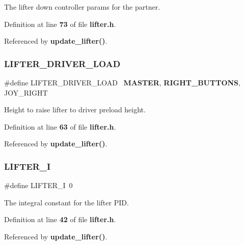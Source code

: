 The lifter down controller params for the partner. 



Definition at line \textbf{ 73} of file \textbf{ lifter.\+h}.



Referenced by \textbf{ update\+\_\+lifter()}.

\mbox{\label{lifter_8h_ad4a88f04887d4f1f4e5fa057b29f68e9}} 
\subsubsection{L\+I\+F\+T\+E\+R\+\_\+\+D\+R\+I\+V\+E\+R\+\_\+\+L\+O\+AD}
{\footnotesize\ttfamily \#define L\+I\+F\+T\+E\+R\+\_\+\+D\+R\+I\+V\+E\+R\+\_\+\+L\+O\+AD~\textbf{ M\+A\+S\+T\+ER}, \textbf{ R\+I\+G\+H\+T\+\_\+\+B\+U\+T\+T\+O\+NS}, J\+O\+Y\+\_\+\+R\+I\+G\+HT}



Height to raise lifter to driver preload height. 



Definition at line \textbf{ 63} of file \textbf{ lifter.\+h}.



Referenced by \textbf{ update\+\_\+lifter()}.

\mbox{\label{lifter_8h_a4950feabec4e85bf27c1f2e4ec98755a}} 
\subsubsection{L\+I\+F\+T\+E\+R\+\_\+I}
{\footnotesize\ttfamily \#define L\+I\+F\+T\+E\+R\+\_\+I~0}



The integral constant for the lifter P\+ID. 



Definition at line \textbf{ 42} of file \textbf{ lifter.\+h}.



Referenced by \textbf{ update\+\_\+lifter()}.

\mbox{\label{lifter_8h_ae5623433650815b810d784e0da176e3c}} 
